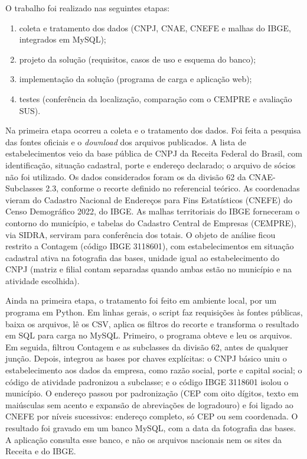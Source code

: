 \documentclass[a4paper,12pt]{article}
\begin{document}
O trabalho foi realizado nas seguintes etapas:

\begin{enumerate}
    \item coleta e tratamento dos dados (CNPJ, CNAE, CNEFE e malhas do IBGE, integrados em MySQL);
    \item projeto da solução (requisitos, casos de uso e esquema do banco);
    \item implementação da solução (programa de carga e aplicação web);
    \item testes (conferência da localização, comparação com o CEMPRE e avaliação SUS).
\end{enumerate}

Na primeira etapa ocorreu a coleta e o tratamento dos dados.
Foi feita a pesquisa das fontes oficiais e o \textit{download} dos arquivos publicados.
A lista de estabelecimentos veio da base pública de CNPJ da Receita Federal do Brasil, com identificação, situação cadastral, porte e endereço declarado; o arquivo de sócios não foi utilizado.
Os dados considerados foram os da divisão 62 da CNAE-Subclasses 2.3, conforme o recorte definido no referencial teórico.
As coordenadas vieram do Cadastro Nacional de Endereços para Fins Estatísticos (CNEFE) do Censo Demográfico 2022, do IBGE.
As malhas territoriais do IBGE forneceram o contorno do município, e tabelas do Cadastro Central de Empresas (CEMPRE), via SIDRA, serviram para conferência dos totais.
O objeto de análise ficou restrito a Contagem (código IBGE 3118601), com estabelecimentos em situação cadastral ativa na fotografia das bases, unidade igual ao estabelecimento do CNPJ (matriz e filial contam separadas quando ambas estão no município e na atividade escolhida).

Ainda na primeira etapa, o tratamento foi feito em ambiente local, por um programa em Python.
Em linhas gerais, o script faz requisições às fontes públicas, baixa os arquivos, lê os CSV, aplica os filtros do recorte e transforma o resultado em SQL para carga no MySQL.
Primeiro, o programa obteve e leu os arquivos.
Em seguida, filtrou Contagem e as subclasses da divisão 62, antes de qualquer junção.
Depois, integrou as bases por chaves explícitas: o CNPJ básico uniu o estabelecimento aos dados da empresa, como razão social, porte e capital social; o código de atividade padronizou a subclasse; e o código IBGE 3118601 isolou o município.
O endereço passou por padronização (CEP com oito dígitos, texto em maiúsculas sem acento e expansão de abreviações de logradouro) e foi ligado ao CNEFE por níveis sucessivos: endereço completo, só CEP ou sem coordenada.
O resultado foi gravado em um banco MySQL, com a data da fotografia das bases.
A aplicação consulta esse banco, e não os arquivos nacionais nem os sites da Receita e do IBGE.
\end{document}
